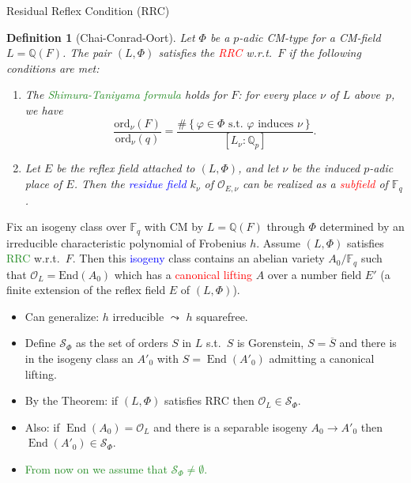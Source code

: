 \documentclass[usenames,dvipsnames,handout]{beamer}
\def\Q{\mathbb{Q}}
\def\F{\mathbb{F}}
\DeclareMathOperator{\End}{End}
\newcommand{\cO}{{\mathcal O}}
\newcommand{\vphi}{\varphi}
\newcommand{\set}[1]{\left\lbrace#1\right\rbrace }
\newcommand{\red}[1]{\textcolor{red}{#1}}
\newcommand{\blue}[1]{\textcolor{blue}{#1}}
\newcommand{\green}[1]{\textcolor{ForestGreen}{#1}}
\newtheorem{df}{Definition}[section]
\begin{document}
\begin{frame}{ Residual Reflex Condition (RRC) }
	\begin{df}[Chai-Conrad-Oort]
		Let $\Phi$ be a $p$-adic CM-type for a CM-field $L=\Q(F)$.
		\pause The pair $(L,\Phi)$ satisfies the \red{RRC} w.r.t.~$F$ 
		if the following conditions are met:
		\begin{enumerate}[1.]
			\pause \item \label{def:RRC_item_st} The \green{Shimura-Taniyama formula} holds for $F$: for every  place $\nu$ of $L$ above~$p$, we have
			\begin{equation*}
			\dfrac{ \mathrm{ord}_\nu(F)}{ \mathrm{ord}_\nu(q)}=\dfrac{\#\set{ \vphi \in \Phi \text{ s.t.~} \vphi \text{ induces } \nu }}{[L_\nu:\Q_p]}.
			\end{equation*}
			\pause \item \label{def:RRC_item_refl} Let $E$ be the reflex field attached to $(L,\Phi)$, and let $\nu$ be the induced $p$-adic place of $E$. Then the \blue{residue field} $k_\nu$ of $\cO_{E,\nu}$
			can be realized as a \red{subfield} of $\F_q$.
		\end{enumerate}
	\end{df}
\end{frame}

\begin{frame}{  }
	\begin{theorem}
		Fix an isogeny class over $\F_q$ with CM by $L = \Q(F)$ through $\Phi$ determined by an irreducible characteristic polynomial of Frobenius $h$. 
		\pause Assume $(L,\Phi)$ satisfies \green{RRC} w.r.t.~$F$. 
		\pause Then this \blue{isogeny} class contains an abelian variety $A_0/\F_q$ such that $\mathcal{O}_L = \mathrm{End}(A_0)$ which has a \red{canonical lifting} $A$ over a number field $E'$ (a finite extension of the reflex field $E$ of $(L,\Phi)$).
	\end{theorem}
	\begin{itemize}
	    \pause \item Can generalize: $h$ irreducible $\leadsto$ $h$ squarefree.
	    \pause \item Define $\mathcal{S}_\Phi$ as the set of orders $S$ in $L$ s.t.~$S$ is Gorenstein, $S = \overline{S}$ and there is in the isogeny class an $A'_0$ with $S=\End(A'_0)$ admitting a canonical lifting.
	    \pause \item By the Theorem: if $(L,\Phi)$ satisfies RRC then $\cO_L\in \mathcal{S}_\Phi$.
	    \pause \item Also: if $\End(A_0)=\cO_L$ and there is a separable isogeny $A_0\to A'_0$ then $\End(A'_0)\in \mathcal{S}_\Phi$.
	    \pause \item \green{From now on we assume that $\mathcal{S}_\Phi\neq \emptyset$.}
	\end{itemize}
\end{frame}
\end{document}
